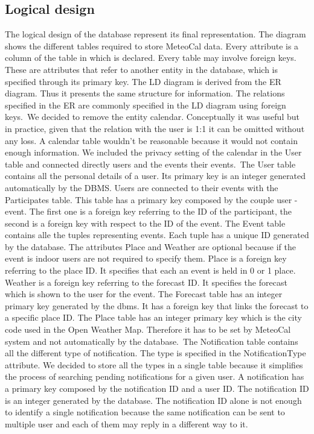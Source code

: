 \documentclass[10pt,a4paper,titlepage]{article}
\begin{document}
\clearpage
\subsection{Logical design}
The logical design of the database represent its final representation. The diagram shows the different tables required to store MeteoCal data. Every attribute is a column of the table in which is declared. Every table may involve foreign keys. These are attributes that refer to another entity in the database, which is specified through its primary key. 
The LD diagram is derived from the ER diagram. Thus it presents the same structure for information. The relations specified in the ER are commonly specified in the LD diagram using foreign keys.\
We decided to remove the entity calendar. Conceptually it was useful but in practice, given that the relation with the user is 1:1 it can be omitted without any loss. A calendar table wouldn’t be reasonable because it would not contain enough information. We included the privacy setting of the calendar in the User table and connected directly users and the events their events.\
The User table contains all the personal details of a user. Its primary key is an integer generated automatically by the DBMS. 
Users are connected to their events with the Participates table. This table has a primary key composed by the couple user - event. The first one is a foreign key referring to the ID of the participant, the second is a foreign key with respect to the ID of the event.
The Event table contains alle the tuples representing events. Each tuple has a unique ID generated by the database. The attributes Place and Weather are optional because if the event is indoor users are not required to specify them. Place is a foreign key referring to the place ID. It specifies that each an event is held in 0 or 1 place. Weather is a foreign key referring to the forecast ID. It specifies the forecast which is shown to the user for the event.
The Forecast table has an integer primary key generated by the dbms. It has a foreign key that links the forecast to a specific place ID. 
The Place table has an integer primary key which is the city code used in the Open Weather Map. Therefore it has to be set by MeteoCal system and not automatically by the database.\
The Notification table contains all the different type of notification. The type is specified in the NotificationType attribute. We decided to store all the types in a single table because it simplifies the process of searching pending notifications for a given user. A notification has a primary key composed by the notification ID and a user ID. The notification ID is an integer generated by the database. The notification ID alone is not enough to identify a single notification because the same notification can be sent to multiple user and each of them may reply in a different way to it.\
\end{document}
